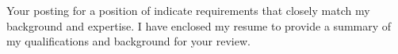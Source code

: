 Your posting for a  position of  indicate requirements that closely match my background and expertise. I have enclosed my resume to provide a summary of my qualifications and background for your review.